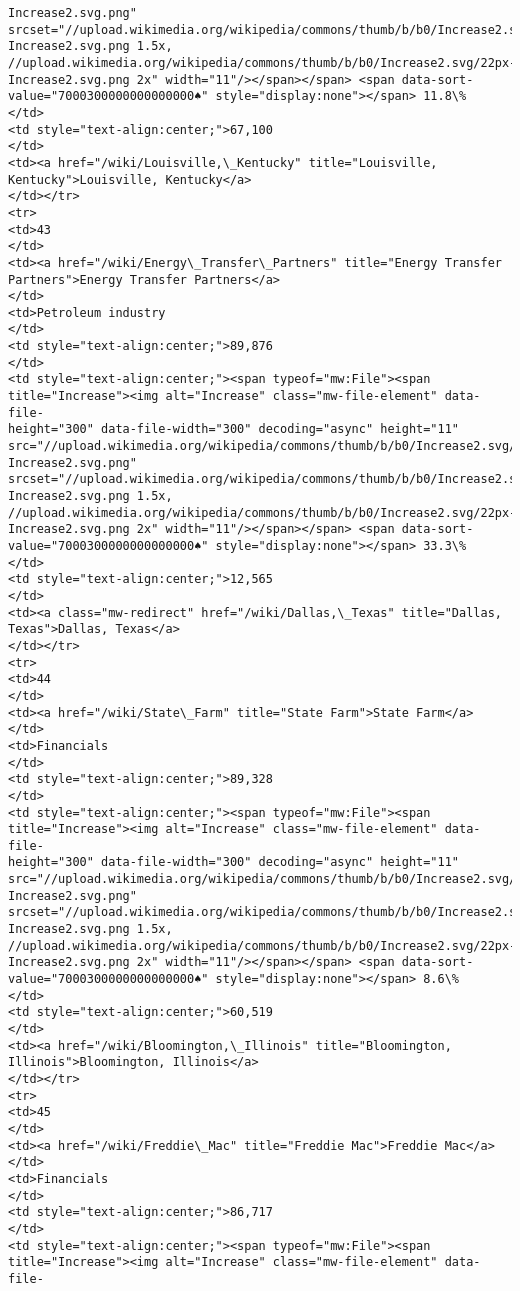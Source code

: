 \documentclass[11pt]{article}
\begin{document}
\begin{Verbatim}[commandchars=\\\{\}]
Increase2.svg.png"
srcset="//upload.wikimedia.org/wikipedia/commons/thumb/b/b0/Increase2.svg/17px-
Increase2.svg.png 1.5x,
//upload.wikimedia.org/wikipedia/commons/thumb/b/b0/Increase2.svg/22px-
Increase2.svg.png 2x" width="11"/></span></span> <span data-sort-
value="7000300000000000000♠" style="display:none"></span> 11.8\%
</td>
<td style="text-align:center;">67,100
</td>
<td><a href="/wiki/Louisville,\_Kentucky" title="Louisville,
Kentucky">Louisville, Kentucky</a>
</td></tr>
<tr>
<td>43
</td>
<td><a href="/wiki/Energy\_Transfer\_Partners" title="Energy Transfer
Partners">Energy Transfer Partners</a>
</td>
<td>Petroleum industry
</td>
<td style="text-align:center;">89,876
</td>
<td style="text-align:center;"><span typeof="mw:File"><span
title="Increase"><img alt="Increase" class="mw-file-element" data-file-
height="300" data-file-width="300" decoding="async" height="11"
src="//upload.wikimedia.org/wikipedia/commons/thumb/b/b0/Increase2.svg/11px-
Increase2.svg.png"
srcset="//upload.wikimedia.org/wikipedia/commons/thumb/b/b0/Increase2.svg/17px-
Increase2.svg.png 1.5x,
//upload.wikimedia.org/wikipedia/commons/thumb/b/b0/Increase2.svg/22px-
Increase2.svg.png 2x" width="11"/></span></span> <span data-sort-
value="7000300000000000000♠" style="display:none"></span> 33.3\%
</td>
<td style="text-align:center;">12,565
</td>
<td><a class="mw-redirect" href="/wiki/Dallas,\_Texas" title="Dallas,
Texas">Dallas, Texas</a>
</td></tr>
<tr>
<td>44
</td>
<td><a href="/wiki/State\_Farm" title="State Farm">State Farm</a>
</td>
<td>Financials
</td>
<td style="text-align:center;">89,328
</td>
<td style="text-align:center;"><span typeof="mw:File"><span
title="Increase"><img alt="Increase" class="mw-file-element" data-file-
height="300" data-file-width="300" decoding="async" height="11"
src="//upload.wikimedia.org/wikipedia/commons/thumb/b/b0/Increase2.svg/11px-
Increase2.svg.png"
srcset="//upload.wikimedia.org/wikipedia/commons/thumb/b/b0/Increase2.svg/17px-
Increase2.svg.png 1.5x,
//upload.wikimedia.org/wikipedia/commons/thumb/b/b0/Increase2.svg/22px-
Increase2.svg.png 2x" width="11"/></span></span> <span data-sort-
value="7000300000000000000♠" style="display:none"></span> 8.6\%
</td>
<td style="text-align:center;">60,519
</td>
<td><a href="/wiki/Bloomington,\_Illinois" title="Bloomington,
Illinois">Bloomington, Illinois</a>
</td></tr>
<tr>
<td>45
</td>
<td><a href="/wiki/Freddie\_Mac" title="Freddie Mac">Freddie Mac</a>
</td>
<td>Financials
</td>
<td style="text-align:center;">86,717
</td>
<td style="text-align:center;"><span typeof="mw:File"><span
title="Increase"><img alt="Increase" class="mw-file-element" data-file-

\end{Verbatim}
\end{document}
